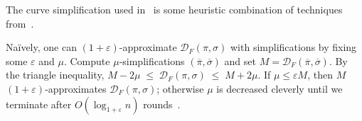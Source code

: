 \documentclass[10pt,a4paper]{article}
\newcommand{\fd}{\mathcal{D}_F}
\begin{document}
\noindent
The curve simplification used in~\cite{harpeled_et_al:LIPIcs.SoCG.2025.54} is some heuristic combination of techniques from~\cite{AronovHKWW06, DriemelHW10}.
\noindent

Naïvely, one can $(1+\varepsilon)$-approximate $\fd(\pi, \sigma)$ with simplifications by fixing some $\varepsilon$ and $\mu$. Compute $\mu$-simplifications $(\overline{\pi},\overline{\sigma})$ and set $M=\fd(\overline{\pi},\overline{\sigma})$. 
By the triangle inequality, $
M-2\mu \;\leq\; \fd(\pi,\sigma) \;\leq\; M+2\mu.$
If $\mu\leq \varepsilon M$, then $M$ $(1+\varepsilon)$-approximates $\fd(\pi,\sigma)$; otherwise $\mu$ is decreased cleverly until we terminate   after $O(\log_{1+\varepsilon} n)$ rounds~\cite{DriemelHW10}.
\end{document}
